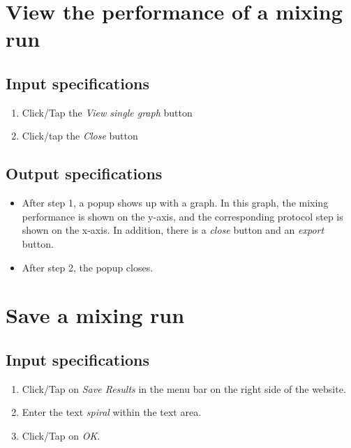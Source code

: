 \section{View the performance of a mixing run}

\subsection*{Input specifications}
\begin{enumerate}
\item Click/Tap the \emph{View single graph} button
\item Click/tap the \emph{Close} button
\end{enumerate}

\subsection*{Output specifications}
\begin{itemize}
\item After step 1, a popup shows up with a graph. In this graph, the mixing performance is shown on the y-axis, and the corresponding protocol step is shown on the x-axis. In addition, there is a \emph{close} button and an \emph{export} button.
\item After step 2, the popup closes.
\end{itemize}

\section{Save a mixing run}

\subsection*{Input specifications}
\begin{enumerate}
\item Click/Tap on \emph{Save Results} in the menu bar on the right side of the website.
\item Enter the text \emph{spiral} within the text area.
\item Click/Tap on \emph{OK}.
\end{enumerate}

